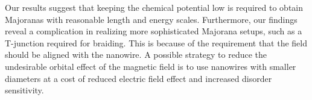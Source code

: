Our results suggest that keeping the chemical potential low is required to obtain Majoranas with reasonable length and energy scales.
Furthermore, our findings reveal a complication in realizing more sophisticated Majorana setups, such as a T-junction required for braiding.
This is because of the requirement that the field should be aligned with the nanowire.
A possible strategy to reduce the undesirable orbital effect of the magnetic field is to use nanowires with smaller diameters at a cost of reduced electric field effect and increased disorder sensitivity.

